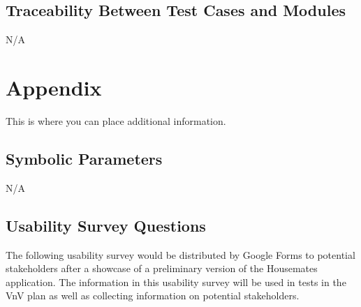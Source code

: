 \documentclass[12pt, titlepage]{article}
\begin{document}
					
					
					
					




\subsection{Traceability Between Test Cases and Modules}

N/A


				
% 

% 

\newpage

\section{Appendix}

This is where you can place additional information.

\subsection{Symbolic Parameters}

N/A


\subsection{Usability Survey Questions}

The following usability survey would be distributed by Google Forms to potential stakeholders after a showcase of a preliminary version of the Housemates application. The information in this usability survey will be used in tests in the VnV plan as well as collecting information on potential stakeholders.
\end{document}
